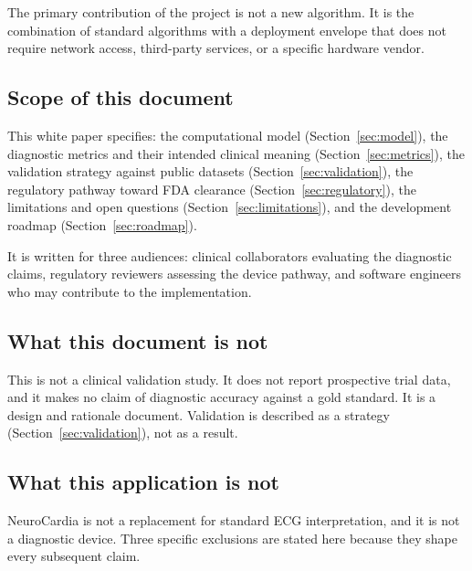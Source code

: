 \documentclass[11pt]{article}
\begin{document}
The primary contribution of the project is not a new algorithm. It is
the combination of standard algorithms with a deployment envelope that
does not require network access, third-party services, or a specific
hardware vendor.

\subsection{Scope of this document}

This white paper specifies: the computational model
(Section~\ref{sec:model}), the diagnostic metrics and their intended
clinical meaning (Section~\ref{sec:metrics}), the validation strategy
against public datasets (Section~\ref{sec:validation}), the regulatory
pathway toward FDA clearance (Section~\ref{sec:regulatory}), the
limitations and open questions (Section~\ref{sec:limitations}), and the
development roadmap (Section~\ref{sec:roadmap}).

It is written for three audiences: clinical collaborators evaluating
the diagnostic claims, regulatory reviewers assessing the device
pathway, and software engineers who may contribute to the
implementation.

\subsection{What this document is not}

This is not a clinical validation study. It does not report prospective
trial data, and it makes no claim of diagnostic accuracy against a gold
standard. It is a design and rationale document. Validation is
described as a strategy (Section~\ref{sec:validation}), not as a
result.

\subsection{What this application is not}

NeuroCardia is not a replacement for standard ECG interpretation, and
it is not a diagnostic device. Three specific exclusions are stated
here because they shape every subsequent claim.
\end{document}
